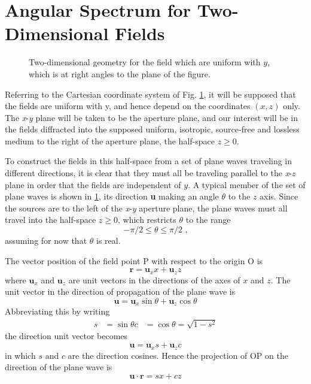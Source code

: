 \section{Angular Spectrum for Two-Dimensional Fields}
\begin{figure}[htbp]
	\begin{center}
	\end{center}
	\caption{Two-dimensional geometry for the field which are uniform with $y$, which is at right angles to the plane of the figure.}
	\label{fig:2dgeo}
\end{figure}
Referring to the Cartesian coordinate system of Fig. \ref{fig:2dgeo}, it will be supposed that the fields are uniform with y, and hence depend on the coordinates $(x,z)$ only. The \textit{x}-\textit{y} plane will be taken to be the aperture plane, and our interest will be in the fields diffracted into the supposed uniform, isotropic, source-free and lossless medium to the right of the aperture plane, the half-space $z\geqslant0$.

To construct the fields in this half-space from a set of plane waves traveling in different directions, it is clear that they must all be traveling parallel to the \textit{x}-\textit{z} plane in order that the fields are independent of $y$. A typical member of the set of plane waves is shown in \ref{fig:2dgeo}, its direction \textbf{u} making an angle $\theta$ to the $z$ axis. Since the sources are to the left of the \textit{x}-\textit{y} aperture plane, the plane waves must all travel into the half-space $z\geqslant0$, which restricts $\theta$ to the range
\begin{equation}
-\pi /2\leqslant \theta \leqslant \pi / 2\text{ ,}
\label{eq:trng}
\end{equation}
assuming for now that $\theta$ is real.

The vector position of the field point P with respect to the origin O is
\begin{equation}
\mathbf{r}=\mathbf{u}_xx+\mathbf{u}_zz
\end{equation}
where $\mathbf{u}_x$ and $\mathbf{u}_z$ are unit vectors in the directions of the axes of $x$ and $z$. The unit vector in the direction of propagation of the plane wave is
\begin{equation}
\mathbf{u}=\mathbf{u}_x\sin\theta+\mathbf{u}_z\cos\theta
\end{equation}
Abbreviating this by writing
\begin{equation}
\begin{aligned}
s&=\sin\theta
c&=\cos\theta=\sqrt{1-s^2}
\end{aligned}
\end{equation}
the direction unit vector becomes
\begin{equation}
\mathbf{u}=\mathbf{u}_xs+\mathbf{u}_zc
\end{equation}
in which $s$ and $c$ are the direction cosines. Hence the projection of OP on the direction of the plane wave is
\begin{equation}
\mathbf{u}\cdot\mathbf{r}=sx+cz
\end{equation}

